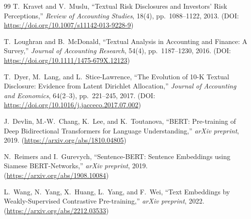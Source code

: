 \begin{thebibliography}{99}
  T.~Kravet and V.~Muslu,
  ``Textual Risk Disclosures and Investors' Risk Perceptions,''
  \textit{Review of Accounting Studies}, 18(4), pp.~1088--1122, 2013.
  (DOI: \url{https://doi.org/10.1007/s11142-013-9228-9})

  T.~Loughran and B.~McDonald,
  ``Textual Analysis in Accounting and Finance: A Survey,''
  \textit{Journal of Accounting Research}, 54(4), pp.~1187--1230, 2016.
  (DOI: \url{https://doi.org/10.1111/1475-679X.12123})

  T.~Dyer, M.~Lang, and L.~Stice-Lawrence,
  ``The Evolution of 10-K Textual Disclosure: Evidence from Latent Dirichlet Allocation,''
  \textit{Journal of Accounting and Economics}, 64(2--3), pp.~221--245, 2017.
  (DOI: \url{https://doi.org/10.1016/j.jacceco.2017.07.002})

  J.~Devlin, M.-W.~Chang, K.~Lee, and K.~Toutanova,
  ``BERT: Pre-training of Deep Bidirectional Transformers for Language Understanding,''
  \textit{arXiv preprint}, 2019.
  (\url{https://arxiv.org/abs/1810.04805})

  N.~Reimers and I.~Gurevych,
  ``Sentence-BERT: Sentence Embeddings using Siamese BERT-Networks,''
  \textit{arXiv preprint}, 2019.
  (\url{https://arxiv.org/abs/1908.10084})

  L.~Wang, N.~Yang, X.~Huang, L.~Yang, and F.~Wei,
  ``Text Embeddings by Weakly-Supervised Contrastive Pre-training,''
  \textit{arXiv preprint}, 2022.
  (\url{https://arxiv.org/abs/2212.03533})

\end{thebibliography}


